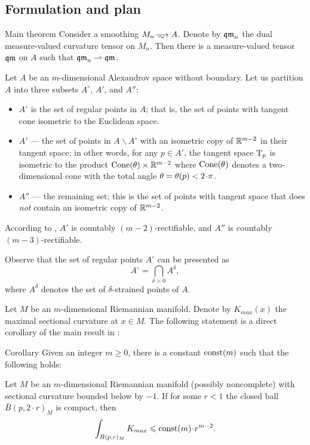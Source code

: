 \subsection{Formulation and plan}
  
\begin{thm}{Main theorem}\label{main}
Consider a smoothing $M_n\smooths{} A$.
Denote by $\operatorname{\mathfrak{qm}}_n$ the dual measure-valued curvature tensor on $M_n$.
Then there is a measure-valued tensor $\operatorname{\mathfrak{qm}}$ on $A$ such that $\operatorname{\mathfrak{qm}}_n\rightharpoonup \operatorname{\mathfrak{qm}}$.
\end{thm}

Let $A$ be an $m$-dimensional Alexandrov space without boundary. 
Let us partition $A$ into three subsets $A^\circ$, $A'$, and $A''$:
\begin{itemize}
\item $A^\circ$ is the set of regular points in $A$; that is, the set of points with tangent cone isometric to the Euclidean space.
\item $A'$ --- the set of points in $A\backslash A^\circ$ with an isometric copy of $\mathbb{R}^{m-2}$ in their tangent space;
in other words, for any $p\in A'$, the tangent space $\mathrm{T}_p$ is isometric to the product $\Cone(\theta)\zz\times\RR^{m-2}$ where $\operatorname{Cone}(\theta)$ denotes a two-dimensional cone with the total angle $\theta\zz=\theta(p)<2\cdot \pi$.
\item $A''$ --- the remaining set; this is the set of points with tangent space that does \textit{not} contain an isometric copy of $\mathbb{R}^{m-2}$.
\end{itemize}
According to \cite{li-naber}, $A'$ is countably $(m-2)$-rectifiable,
and $A''$ is countably $(m-3)$-rectifiable. 

Observe that the set of regular points $A^\circ$ can be presented as
$$A^{\circ}=\bigcap_{\delta>0} A^\delta,$$
where $A^\delta$ denotes the set of $\delta$-strained points of $A$.

Let $M$ be an $m$-dimensional Riemannian manifold.
Denote by $K_{max}(x)$ the maximal sectional curvature at $x\in M$.
The following statement is a direct corollary of the main result in \cite{petrunin-SC}:

\begin{thm}{Corollary}\label{cor:Kmax}
Given an integer $m\ge 0$, there is a constant $\mathrm{const}(m)$ such that the following holds:

Let $M$ be an $m$-dimensional Riemannian manifold 
(possibly noncomplete)
with sectional curvature bounded below by $-1$.
If for some $r<1$ the closed ball $\bar B(p,2\cdot r)_M$ is compact,
then 
$$\int_{B(p,r)_M} K_{max}\le \const(m)\cdot r^{m-2}.$$

\end{thm}

